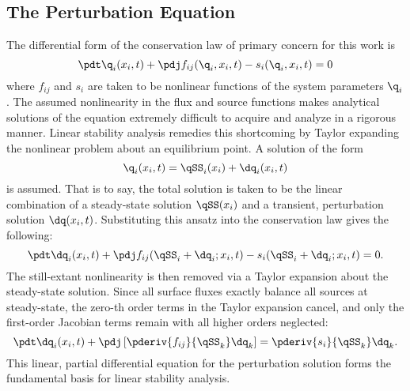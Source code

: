 \subsection{The Perturbation Equation}
The differential form of the conservation law of primary concern for this work is
\begin{equation}
    \pdt\q_i(x_i,t) + \pdj f_{ij}(\q_i,x_i,t) - s_i(\q_i,x_i,t) = 0
\end{equation}
where $f_{ij}$ and $s_i$ are taken to be nonlinear functions of the system parameters $\q_i$.
The assumed nonlinearity in the flux and source functions makes analytical solutions of the equation extremely difficult to acquire and analyze in a rigorous manner.
Linear stability analysis remedies this shortcoming by Taylor expanding the nonlinear problem about an equilibrium point.
A solution of the form
\begin{equation}
    \q_i(x_i,t) = \qSS_i(x_i) + \dq_i(x_i,t)
\end{equation}
is assumed.
That is to say, the total solution is taken to be the linear combination of a steady-state solution $\qSS(x_i)$ and a transient, perturbation solution $\dq(x_i,t)$.
Substituting this ansatz into the conservation law gives the following:
\begin{equation}
    \pdt\dq_i(x_i,t) + \pdj f_{ij}( \qSS_i + \dq_i;x_i,t) - s_i(\qSS_i + \dq_i;x_i,t) = 0.
\end{equation}
The still-extant nonlinearity is then removed via a Taylor expansion about the steady-state solution.
Since all surface fluxes exactly balance all sources at steady-state, the zero-th order terms in the Taylor expansion cancel, and only the first-order Jacobian terms remain with all higher orders neglected:
\begin{equation}
    \pdt\dq_i(x_i,t) + \pdj\left[\pderiv{f_{ij}}{\qSS_k{}} \dq_k\right] = \pderiv{s_i}{\qSS_k{}}\dq_k.
\end{equation}
This linear, partial differential equation for the perturbation solution forms the fundamental basis for linear stability analysis.

